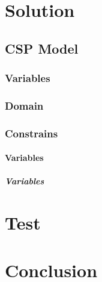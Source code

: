 \documentclass[a4paper]{article}
\theoremstyle{definition}
\theoremstyle{remark}
\begin{document}
% 
% 
% 
% 







\section{Solution}
\subsection{CSP Model}
\subsubsection{Variables}
\subsubsection{Domain}
\subsubsection{Constrains}

\paragraph{Variables}
\subparagraph{Variables}
\subsection{}
\section{Test}
\section{Conclusion}
\end{document}
